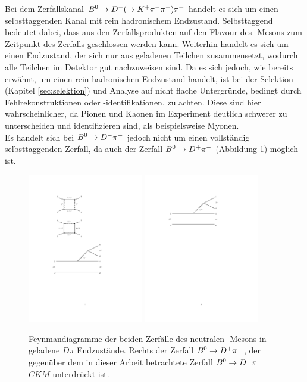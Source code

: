 Bei dem Zerfallskanal ${{B}^0}\rightarrow{\ensuremath{{D}^-}}(\rightarrow {\ensuremath{{K}^+}}{\ensuremath{{\pi}^-}}{\ensuremath{{\pi}^-}}){{\pi}^+}$ handelt es sich um einen selbsttaggenden Kanal mit rein hadronischem Endzustand. Selbsttaggend bedeutet dabei, dass aus den Zerfallsprodukten auf den Flavour des \B-Mesons zum Zeitpunkt des Zerfalls geschlossen werden kann. Weiterhin handelt es sich um einen Endzustand, der sich nur aus geladenen Teilchen zusammensetzt, wodurch alle Teilchen im Detektor gut nachzuweisen sind. Da es sich jedoch, wie bereits erwähnt, um einen rein hadronischen Endzustand handelt, ist bei der Selektion (Kapitel \ref{sec:selektion}) und Analyse auf nicht flache Untergründe, bedingt durch Fehlrekonstruktionen oder -identifikationen, zu achten. Diese sind hier wahrscheinlicher, da Pionen und Kaonen im Experiment deutlich schwerer zu unterscheiden und identifizieren sind, als beispielsweise Myonen.\\
Es handelt sich bei ${{B}^0}\rightarrow {\ensuremath{{D}^-}}{\ensuremath{{\pi}^+}}$ jedoch nicht um einen vollständig selbsttaggenden Zerfall, da auch der Zerfall ${{B}^0}\rightarrow D^+{{\pi}^-}$ (Abbildung \ref{fig:b2dpi}) möglich ist. 
\begin{figure}[htpb]
	\centering
		\includegraphics[width=0.45\textwidth]{fig/B2D-pi+.pdf}
		\includegraphics[width=0.45\textwidth]{fig/B2D+pi-.pdf}
	\caption{Feynmandiagramme der beiden Zerfälle des neutralen \B-Mesons in geladene $D\pi$ Endzustände. Rechts der Zerfall ${{B}^0}\rightarrow D^+{{\pi}^-}$, der gegenüber dem in dieser Arbeit betrachtete Zerfall ${{B}^0}\rightarrow {\ensuremath{{D}^-}}{\ensuremath{{\pi}^+}}$ $C\!K\!M$ unterdrückt ist.}
	\label{fig:b2dpi} 
\end{figure}  
